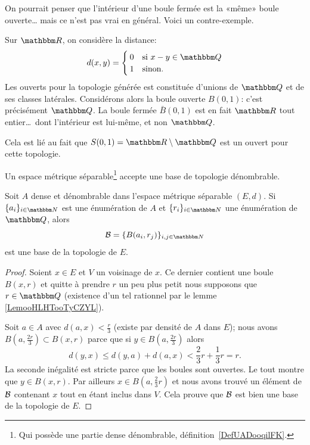 \begin{remark}
  On pourrait penser que l'intérieur d'une boule fermée est la «même» boule ouverte\dots{} mais ce n'est pas vrai en général. Voici un contre-exemple.

  Sur \( \eR \), on considère la distance:
  \begin{equation}
    d(x,y) =
    \begin{cases}
      0 &\text{si }x-y \in \eQ\\
      1 &\text{sinon.}
    \end{cases}
  \end{equation}
  Les ouverts pour la topologie générée est constituée d'unions de \( \eQ \) et de ses classes latérales. Considérons alors la boule ouverte \( B(0,1) \): c'est précisément \( \eQ \). La boule fermée \( \bar B(0,1) \) est en fait \( \eR \) tout entier\dots\ dont l'intérieur est lui-même, et non \( \eQ \).

  Cela est lié au fait que \( S(0,1) = \eR \setminus \eQ \) est un ouvert pour cette topologie.
\end{remark}


\begin{proposition} \label{PropNBSooraAFr}
    Un espace métrique séparable\footnote{Qui possède une partie dense dénombrable, définition~\ref{DefUADooqilFK}.} accepte une base de topologie dénombrable.

     Soit \( A\) dense et dénombrable dans l'espace métrique séparable \( (E,d)\). Si \( \{ a_i \}_{i\in \eN}\) est une énumération de \( A\) et \( \{ r_i \}_{i\in \eN}\) une énumération de \( \eQ\), alors
    \begin{equation}
        \mB=\{ B(a_i,r_j) \}_{i,j\in \eN}
    \end{equation}
    est une base de la topologie de \( E\).
\end{proposition}

\begin{proof}
    Soient \( x\in E\) et \( V\) un voisinage de \( x\). Ce dernier contient une boule \( B(x,r)\) et quitte à prendre \( r\) un peu plus petit nous supposons que \( r\in \eQ\) (existence d'un tel rationnel par le lemme \ref{LemooHLHTooTyCZYL}).

    Soit \( a\in A\) avec \( d(a,x) <\frac{ r }{ 3 }\) (existe par densité de \( A\) dans \( E\)); nous avons \( B(a,\frac{ 2r }{ 3 })\subset B(x,r)\) parce que si \( y\in B( a,\frac{ 2r }{ 3 } )\) alors
    \begin{equation}
        d( y, x) \leq d(y, a) + d( a, x) < \frac{ 2 }{ 3 }r+\frac{ 1 }{ 3 }r=r.
    \end{equation}
    La seconde inégalité est stricte parce que les boules sont ouvertes. Le tout montre que \( y\in B(x,r)\). Par ailleurs \( x\in B(a,\frac{ 2 }{ 3 }r)\) et nous avons trouvé un élément de \( \mathcal{B}\) contenant \( x\) tout en étant inclus dans \( V\). Cela prouve que \( \mathcal{B}\) est bien une base de la topologie de \( E\).
\end{proof}


